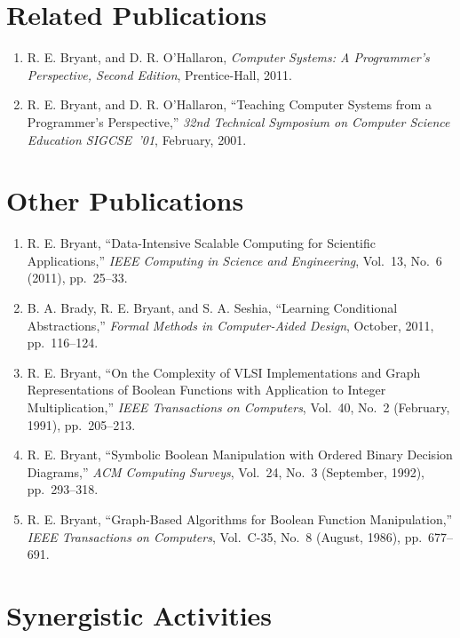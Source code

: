 \documentclass{article}
\newenvironment{denseenumerate}%
	{\begin{enumerate}\setlength{\itemsep}{0pt}\setlength{\parsep}{0pt}}%
	{\end{enumerate}}
\begin{document}
\section*{Related Publications}

\begin{denseenumerate}
\item
R. E. Bryant, and D. R. O'Hallaron,
{\em Computer Systems: A Programmer's Perspective, Second Edition},
Prentice-Hall, 2011.

\item
R. E. Bryant, and D. R. O'Hallaron,
``Teaching Computer Systems from a Programmer's Perspective,''
{\em 32nd Technical Symposium on Computer Science Education SIGCSE~'01},
February, 2001.
\end{denseenumerate}

\section*{Other Publications}

\begin{denseenumerate}
\item
R. E. Bryant,
``Data-Intensive Scalable Computing for Scientific Applications,''
{\em IEEE Computing in Science and Engineering},
Vol.~13, No.~6 (2011),
pp.~25--33.

\item
B. A. Brady, R. E. Bryant, and S. A. Seshia,
``Learning Conditional Abstractions,''
{\em Formal Methods in Computer-Aided Design},
October, 2011,
pp.~116--124.

\item
R. E. Bryant,
``On the Complexity of VLSI Implementations and Graph Representations of
Boolean Functions with Application to Integer Multiplication,''
{\it IEEE Transactions on Computers}, Vol.~40, No.~2 (February, 1991),
pp.~205--213.

\item
R. E. Bryant,
``Symbolic Boolean Manipulation with Ordered Binary Decision
Diagrams,''
{\em ACM Computing Surveys},
Vol.~24, No.~3 (September, 1992), pp.~293--318.

\item
R. E. Bryant,
``Graph-Based Algorithms for Boolean Function Manipulation,''
 {\it IEEE Transactions on Computers}, Vol.\ C-35, No.\ 8 (August, 1986),
pp.~677--691.

\end{denseenumerate}

\section*{Synergistic Activities}
\end{document}
